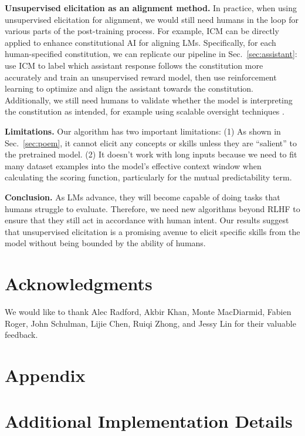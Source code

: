 \documentclass{article}
\newcommand{\ourmethod}[0]{\textsc{ICM}\xspace}
\begin{document}
\textbf{Unsupervised elicitation as an alignment method.} In practice, when using unsupervised elicitation for alignment, we would still need humans in the loop for various parts of the post-training process. For example, \ourmethod can be directly applied to enhance constitutional AI \citep{bai2022constitutional} for aligning LMs. Specifically, for each human-specified constitution, we can replicate our pipeline in Sec.~\ref{sec:assistant}: use \ourmethod to label which assistant response follows the constitution more accurately and train an unsupervised reward model, then use reinforcement learning to optimize and align the assistant towards the constitution. Additionally, we still need humans to validate whether the model is interpreting the constitution as intended, for example using scalable oversight techniques \citep{saunders2022self,mcaleese2024llm, wen2024learning}.

\textbf{Limitations.} Our algorithm has two important limitations: (1) As shown in Sec.~\ref{sec:poem}, it cannot elicit any concepts or skills unless they are ``salient'' to the pretrained model. (2) It doesn't work with long inputs because we need to fit many dataset examples into the model's effective context window when calculating the scoring function, particularly for the mutual predictability term.


\textbf{Conclusion.}
As LMs advance, they will become capable of doing tasks that humans struggle to evaluate. Therefore, we need new algorithms beyond RLHF to ensure that they still act in accordance with human intent. Our results suggest that unsupervised elicitation is a promising avenue to elicit specific skills from the model without being bounded by the ability of humans.

\section*{Acknowledgments}

We would like to thank Alec Radford, Akbir Khan, Monte MacDiarmid, Fabien Roger, John Schulman, Lijie Chen, Ruiqi Zhong, and Jessy Lin for their valuable feedback.





\appendix

\section*{Appendix}

\section{Additional Implementation Details}
\end{document}
